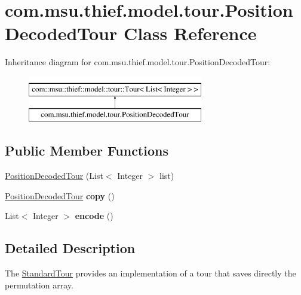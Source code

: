 \hypertarget{classcom_1_1msu_1_1thief_1_1model_1_1tour_1_1PositionDecodedTour}{\section{com.\-msu.\-thief.\-model.\-tour.\-Position\-Decoded\-Tour Class Reference}
\label{classcom_1_1msu_1_1thief_1_1model_1_1tour_1_1PositionDecodedTour}
}
Inheritance diagram for com.\-msu.\-thief.\-model.\-tour.\-Position\-Decoded\-Tour\-:\begin{figure}[H]
\begin{center}
\leavevmode
\includegraphics[height=2.000000cm]{classcom_1_1msu_1_1thief_1_1model_1_1tour_1_1PositionDecodedTour}
\end{center}
\end{figure}
\subsection*{Public Member Functions}
\begin{DoxyCompactItemize}
\item 
\hyperlink{classcom_1_1msu_1_1thief_1_1model_1_1tour_1_1PositionDecodedTour_ab54d9954655abe66c783c09b819f5ab1}{Position\-Decoded\-Tour} (List$<$ Integer $>$ list)
\item 
\hypertarget{classcom_1_1msu_1_1thief_1_1model_1_1tour_1_1PositionDecodedTour_afc4625da94122b54f478d4f58de3202a}{\hyperlink{classcom_1_1msu_1_1thief_1_1model_1_1tour_1_1PositionDecodedTour}{Position\-Decoded\-Tour} {\bfseries copy} ()}\label{classcom_1_1msu_1_1thief_1_1model_1_1tour_1_1PositionDecodedTour_afc4625da94122b54f478d4f58de3202a}

\item 
\hypertarget{classcom_1_1msu_1_1thief_1_1model_1_1tour_1_1PositionDecodedTour_a65351c900d4dcf685bd4703884297754}{List$<$ Integer $>$ {\bfseries encode} ()}\label{classcom_1_1msu_1_1thief_1_1model_1_1tour_1_1PositionDecodedTour_a65351c900d4dcf685bd4703884297754}

\end{DoxyCompactItemize}


\subsection{Detailed Description}
The \hyperlink{classcom_1_1msu_1_1thief_1_1model_1_1tour_1_1StandardTour}{Standard\-Tour} provides an implementation of a tour that saves directly the permutation array.

